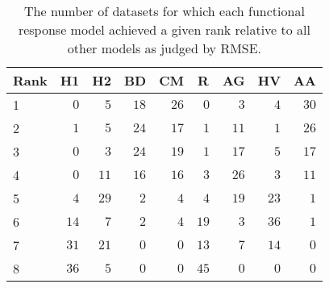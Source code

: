 \begin{table}[!tbp]
\caption{The number of datasets for which each functional response model achieved a given rank relative to all other models as judged by RMSE.\label{table:RMSE_rankings}} 
\begin{center}
\begin{tabular}{lrrrrrrrr}
\hline\hline
\multicolumn{1}{l}{Rank}&\multicolumn{1}{c}{H1}&\multicolumn{1}{c}{H2}&\multicolumn{1}{c}{BD}&\multicolumn{1}{c}{CM}&\multicolumn{1}{c}{R}&\multicolumn{1}{c}{AG}&\multicolumn{1}{c}{HV}&\multicolumn{1}{c}{AA}\tabularnewline
\hline
1&$ 0$&$ 5$&$18$&$26$&$ 0$&$ 3$&$ 4$&$30$\tabularnewline
2&$ 1$&$ 5$&$24$&$17$&$ 1$&$11$&$ 1$&$26$\tabularnewline
3&$ 0$&$ 3$&$24$&$19$&$ 1$&$17$&$ 5$&$17$\tabularnewline
4&$ 0$&$11$&$16$&$16$&$ 3$&$26$&$ 3$&$11$\tabularnewline
5&$ 4$&$29$&$ 2$&$ 4$&$ 4$&$19$&$23$&$ 1$\tabularnewline
6&$14$&$ 7$&$ 2$&$ 4$&$19$&$ 3$&$36$&$ 1$\tabularnewline
7&$31$&$21$&$ 0$&$ 0$&$13$&$ 7$&$14$&$ 0$\tabularnewline
8&$36$&$ 5$&$ 0$&$ 0$&$45$&$ 0$&$ 0$&$ 0$\tabularnewline
\hline
\end{tabular}\end{center}
\end{table}
